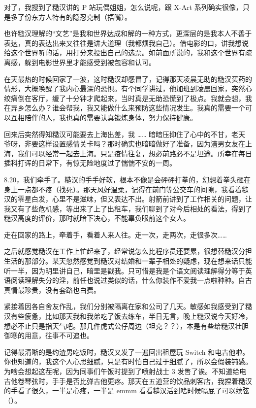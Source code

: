 \documentclass[a4paper, zihao=-4, utf8]{ctexart}
\begin{document}
对了，我搜到了糙汉讲的 P 站玩偶姐姐，怎么说呢，跟 X-Art 系列确实很像，只是多了份东方人特有的隐忍克制（捂嘴）。

也许糙汉理解的“文艺”是我和世界达成和解的一种方式，更深层的是我本人不善于表达，真的表达出来又往往是讲大道理（我都烦我自己）。借电影的口，讲我想说给这个世界听的话，用打分来投出自己的选票。如前面所说的，我和这个世界有疏离感，躲到电影世界里才能感受到被包容和认可。

在天最热的时候回家了一波，这时糙汉却感冒了，记得那天凌晨无助的糙汉买药的情形，大概唤醒了我内心最深的恐惧。有个同学讲过，他加班到凌晨回家，突然心绞痛倒在客厅，缓了十分钟才爬起来，当时真是无助恐慌到了极点。我就会想，我在异乡怎么办？谁会帮我，我又能做什么来预防这些情况发生。我真的需要一个可以互相陪伴的人，我也真的需要认真锻炼身体，努力保持健康。

回来后突然得知糙汉可能要去上海出差，我 …… 暗暗压抑住了心中的不甘，老天爷呀，非要这样设置感情关卡吗？那时确实也暗暗做好了准备，因为渣男女友在上海，我们可以经常一起去上海。只是疫情往复，想必前路必不是坦途。所幸在每日插科打诨的日常下，有惊无险地度过了惴惴不安的一周。

8.20，我们牵手了。糙汉的手手好软，根本不像是会砰砰打拳的，幻想着拳头砸在身上一点都不疼（找死）。那天风好温柔，记得在前门等公交车的间隙，我看着糙汉的零星白发，心里不是滋味，但又表达不出。射箭前讲到了工作相关的问题，让我又有了些危机感，等出来了上了出租车，我们聊到了对今后相处的看法，得到了糙汉高度的评价，那时就暗下决心，不能辜负眼前这个女人。

走在回家的路上，牵着手，看着人来人往。走一次，走两次，走很多次……

之后就感觉糙汉在工作上忙起来了，经常说怎么比程序员还要累，很想替糙汉分担生活的那部分。某天忽然感觉到糙汉对结婚和一辈子相处的疑虑，现在想来话只能听一半，因为明里讲自己，暗里是戳我。只可惜是我是个语文阅读理解得分等于英语阅读理解失分的淫，前任也说过类似的话，什么你装作不爱我一点啦种种。自古真情最珍贵，没有套路也白费。

紧接着因各自舍友作乱，我们分别被隔离在家和公司了几天。敏感如我感受到了糙汉有些疲惫，比如那天我和我弟吃了饭去练车，半日无言，晚上糙汉说今天好冷，想必不止只是指天气吧。那几件虎式公仔周边（坦克？？），本是有些给糙汉壮胆御寒的用意，往事不可追也。

记得最清晰的是约渣男吃饭时，糙汉又发了一遍回出租屋玩 Switch 和电吉他啦。你也知道的，我这个人心思细腻，只是有时怕自己过于细腻了，所以会假装钝感。为啥会想起这茬呢，因为同事们午饭时提到了喷射战士 3 发售了诶。不知道给电吉他卷琴弦时，手手是否比弹吉他更疼。那天在五道营的饮品刺客店，我捏着糙汉的手看了很久，一半是心疼，一半是 emmm 看看糙汉活到啥时候嗝屁了可以续弦（）。
\end{document}
